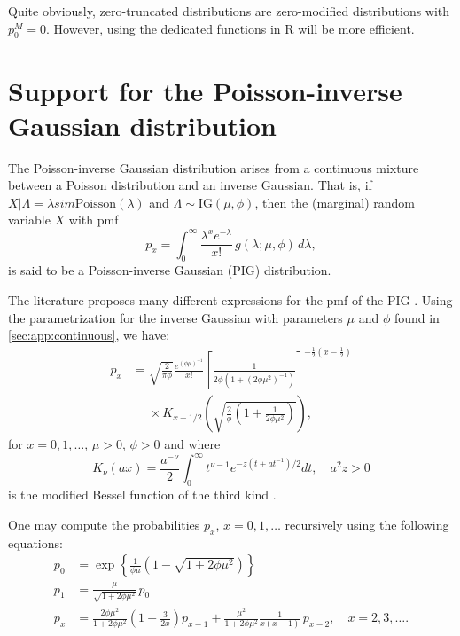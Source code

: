 \documentclass[x11names]{article}
\newcommand{\proglang}[1]{\textsf{#1}}
\begin{document}
Quite obviously, zero-truncated distributions are zero-modified
distributions with $p_0^M = 0$. However, using the dedicated functions
in \proglang{R} will be more efficient.


\section{Support for the Poisson-inverse Gaussian distribution}
\label{sec:pig}

The Poisson-inverse Gaussian distribution arises from a continuous
mixture between a Poisson distribution and an inverse Gaussian. That
is, if $X|\Lambda = \lambda sim \text{Poisson}(\lambda)$ and
$\Lambda \sim \text{IG}(\mu, \phi)$, then the (marginal) random
variable $X$ with pmf
\begin{equation*}
  p_x = \int_0^\infty \frac{\lambda^x e^{-\lambda}}{x!}\, g(\lambda;
  \mu, \phi)\, d\lambda,
\end{equation*}
is said to be a Poisson-inverse Gaussian (PIG) distribution.

The literature proposes many different expressions for the pmf of the
PIG
\citep{Holla:PIG:1966,Shaban:PIG:1981,Johnson:discrete:2005,LossModels4e}.
Using the parametrization for the inverse Gaussian with parameters
$\mu$ and $\phi$ found in \autoref{sec:app:continuous}, we have:
\begin{equation}
  \label{eq:pig:px}
  \begin{split}
    p_x &= \sqrt{\frac{2}{\pi \phi}} \frac{e^{(\phi\mu)^{-1}}}{x!}
    \left[ \frac{1}{2\phi (1 + (2\phi\mu^2)^{-1})}
    \right]^{-\frac{1}{2}(x - \frac{1}{2})} \\
    &\phantom{=} \times K_{x - 1/2} \left( \sqrt{\frac{2}{\phi}\left(1
          + \frac{1}{2\phi\mu^2}\right)} \right),
  \end{split}
\end{equation}
for $x = 0, 1, \dots$, $\mu > 0$, $\phi > 0$ and where
\begin{equation*}
  K_\nu(ax) = \frac{a^{-\nu}}{2} \int_0^\infty t^{\nu - 1}
  e^{- z(t + at^{-1})/2} dt, \quad a^2 z > 0
\end{equation*}
is the modified Bessel function of the third kind
\citep{Bateman:1953:2,Abramowitz:1972}.

One may compute the probabilities $p_x$, $x = 0, 1, \dots$ recursively
using the following equations:
\begin{equation}
  \label{eq:pig:px:recursive}
  \begin{split}
    p_0 &= \exp\left\{ \frac{1}{\phi\mu} (1 - \sqrt{1 + 2\phi\mu^2})
    \right\} \\
    p_1 &= \frac{\mu}{\sqrt{1 + 2\phi\mu^2}}\, p_0 \\
    p_x &= \frac{2\phi\mu^2}{1 + 2\phi\mu^2} \left( 1 - \frac{3}{2x}
    \right) p_{x - 1} + \frac{\mu^2}{1 + 2\phi\mu^2} \frac{1}{x(x -
      1)}\, p_{x - 2}, \quad x = 2, 3, \dots.
  \end{split}
\end{equation}
\end{document}
